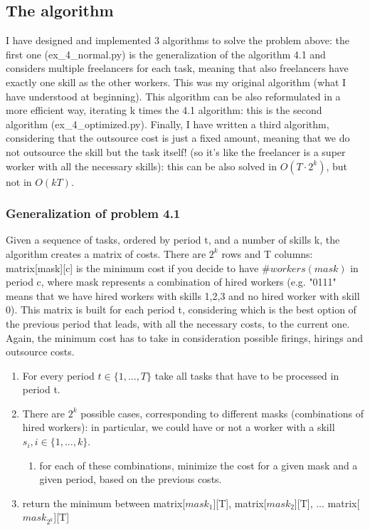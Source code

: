 \subsection{The algorithm}
I have designed and implemented 3 algorithms to solve the problem above: the first one (ex\_4\_normal.py) is the generalization of the algorithm 4.1 and considers multiple freelancers for each task, meaning that also freelancers have exactly one skill as the other workers. This was my original algorithm (what I have understood at beginning). This algorithm can be also reformulated in a more efficient way, iterating k times the 4.1 algorithm: this is the second algorithm (ex\_4\_optimized.py). Finally, I have written a third algorithm, considering that the outsource cost is just a fixed amount, meaning that we do not outsource the skill but the task itself! (so it's like the freelancer is a super worker with all the necessary skills): this can be also solved in $O(T \cdot 2^k)$, but not in $O(kT)$.

\subsubsection{Generalization of problem 4.1}
Given a sequence of tasks, ordered by period t, and a number of skills k, the algorithm creates a matrix of costs. There are $2^k$ rows and T columns: matrix[mask][c] is the minimum cost if you decide to have $\# workers(mask)$ in period c, where mask represents a combination of hired workers (e.g. "0111" means that we have hired workers with skills 1,2,3 and no hired worker with skill 0). This matrix is built for each period t, considering which is the best option of the previous period that leads, with all the necessary costs, to the current one. Again, the minimum cost has to take in consideration possible firings, hirings and outsource costs.
\begin{enumerate}
	\item For every period $t \in \{1,..., T\}$ take all tasks that have to be processed in period t.
	\item There are $2^k$ possible cases, corresponding to different masks (combinations of hired workers): in particular, we could have or not a worker with a skill $s_i, i \in \{1, ..., k\}$.
	\begin{enumerate}
		\item for each of these combinations, minimize the cost for a given mask and a given period, based on the previous costs.
	\end{enumerate}
	\item return the minimum between matrix[$mask_1$][T], matrix[$mask_2$][T], ... matrix[$mask_{2^k}$][T]
\end{enumerate}

